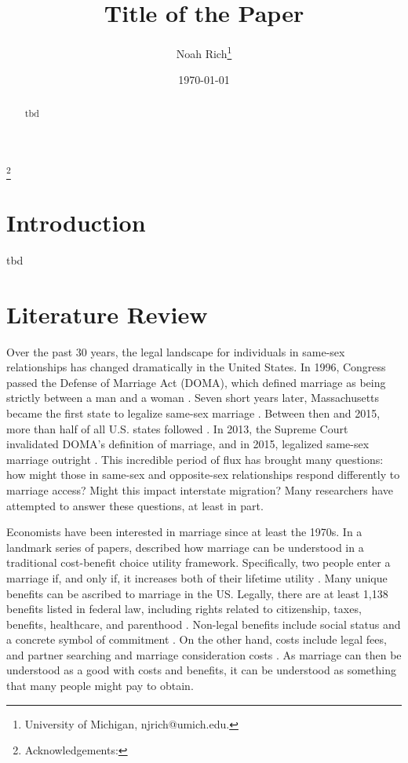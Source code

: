 \documentclass[12pt,letterpaper]{article}
\title{Title of the Paper}
\author{Noah Rich\footnote{University of Michigan, njrich@umich.edu.}}
\date{\today}
\begin{document}
\maketitle
\footnote{Acknowledgements:}

\begin{abstract}
    tbd
\end{abstract}

\newpage

\section{Introduction}

tbd

\section{Literature Review}
Over the past 30 years, the legal landscape for individuals in same-sex relationships has changed dramatically in the United States. In 1996, Congress passed the Defense of Marriage Act (DOMA), which defined marriage as being strictly between a man and a woman \citep{5}. Seven short years later, Massachusetts became the first state to legalize same-sex marriage \citep{1, 3, 5}. Between then and 2015, more than half of all U.S. states followed \citep{12}. In 2013, the Supreme Court invalidated DOMA’s definition of marriage, and in 2015, legalized same-sex marriage outright \citep{1, 3, 5, 12}. This incredible period of flux has brought many questions: how might those in same-sex and opposite-sex relationships respond differently to marriage access? Might this impact interstate migration? Many researchers have attempted to answer these questions, at least in part.

Economists have been interested in marriage since at least the 1970s. In a landmark series of papers, \citet{9} described how marriage can be understood in a traditional cost-benefit choice utility framework. Specifically, two people enter a marriage if, and only if, it increases both of their lifetime utility \citep{9}. Many unique benefits can be ascribed to marriage in the US. Legally, there are at least 1,138 benefits listed in federal law, including rights related to citizenship, taxes, benefits, healthcare, and parenthood \citep{1, 8}. Non-legal benefits include social status and a concrete symbol of commitment \citep{8}. On the other hand, costs include legal fees, and partner searching and marriage consideration costs \citep{9}. As marriage can then be understood as a good with costs and benefits, it can be understood as something that many people might pay to obtain. 
\end{document}
